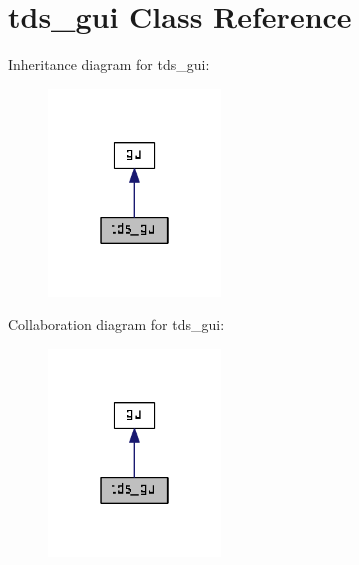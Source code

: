 \hypertarget{classtds__gui}{}\section{tds\+\_\+gui Class Reference}
\label{classtds__gui}


Inheritance diagram for tds\+\_\+gui\+:\nopagebreak
\begin{figure}[H]
\begin{center}
\leavevmode
\includegraphics[width=130pt]{classtds__gui__inherit__graph}
\end{center}
\end{figure}


Collaboration diagram for tds\+\_\+gui\+:\nopagebreak
\begin{figure}[H]
\begin{center}
\leavevmode
\includegraphics[width=130pt]{classtds__gui__coll__graph}
\end{center}
\end{figure}
